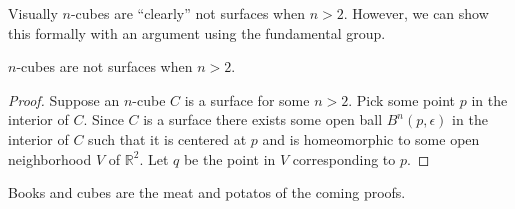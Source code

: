 Visually \(n\)-cubes are ``clearly'' not surfaces when \(n > 2\).
However, we can show this formally with an argument using the fundamental group.
\begin{thm}
\(n\)-cubes are not surfaces when \(n > 2\).
\end{thm}
\begin{proof}
    Suppose an \(n\)-cube \(C\) is a surface for some \(n > 2\).
    Pick some point \(p\) in the interior of \(C\).
    Since \(C\) is a surface there exists some open ball \(B^n(p, \epsilon)\) in the interior of \(C\) such that 
    it is centered at \(p\) and is homeomorphic to some open neighborhood \(V\) of \(\mathbb{R}^2\).
    Let \(q\) be the point in \(V\) corresponding to \(p\).
    
\end{proof}

Books and cubes are the meat and potatos of the coming proofs.